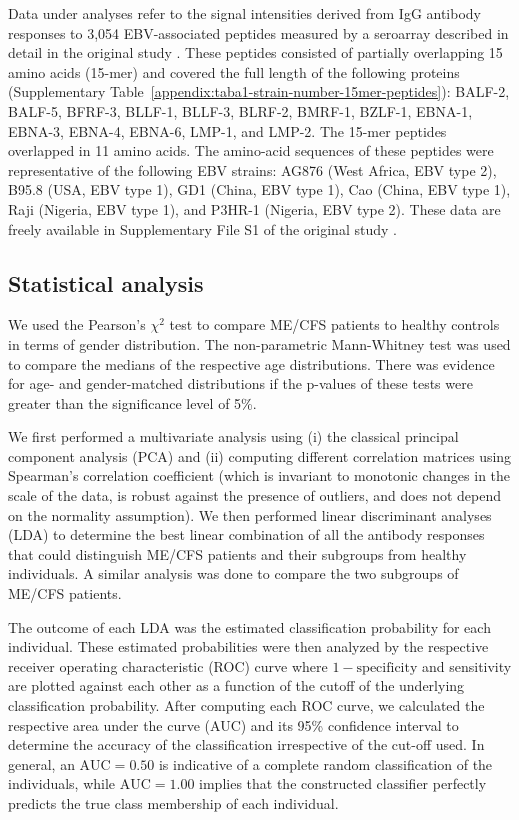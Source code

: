Data under analyses refer to the signal intensities derived from IgG antibody responses to 3,054 EBV-associated peptides measured by a seroarray described in detail in the original study \citep{loebel2017SerologicalProfiling}. These peptides consisted of partially overlapping 15 amino acids (15-mer) and covered the full length of the following proteins (Supplementary Table~\ref{appendix:taba1-strain-number-15mer-peptides}): BALF-2, BALF-5, BFRF-3, BLLF-1, BLLF-3, BLRF-2, BMRF-1, BZLF-1, EBNA-1, EBNA-3, EBNA-4, EBNA-6, LMP-1, and LMP-2. The 15-mer peptides overlapped in 11 amino acids. The amino-acid sequences of these peptides were representative of the following EBV strains: AG876 (West Africa, EBV type 2), B95.8 (USA, EBV type 1), GD1 (China, EBV type 1), Cao (China, EBV type 1), Raji (Nigeria, EBV type 1), and P3HR-1 (Nigeria, EBV type 2). These data are freely available in Supplementary File S1 of the original study \citep{loebel2017SerologicalProfiling}.


\subsection{Statistical analysis}

We used the Pearson's $\chi^2$ test to compare ME/CFS patients to healthy controls in terms of gender distribution. The non-parametric Mann-Whitney test was used to compare the medians of the respective age distributions. There was evidence for age- and gender-matched distributions if the p-values of these tests were greater than the significance level of 5\%.

We first performed a multivariate analysis using (i) the classical principal component analysis (PCA) and (ii) computing different correlation matrices using Spearman's correlation coefficient (which is invariant to monotonic changes in the scale of the data, is robust against the presence of outliers, and does not depend on the normality assumption). We then performed linear discriminant analyses (LDA) to determine the best linear combination of all the antibody responses that could distinguish ME/CFS patients and their subgroups from healthy individuals. A similar analysis was done to compare the two subgroups of ME/CFS patients.

The outcome of each LDA was the estimated classification probability for each individual. These estimated probabilities were then analyzed by the respective receiver operating characteristic (ROC) curve where $1 - \text{specificity}$ and sensitivity are plotted against each other as a function of the cutoff of the underlying classification probability. After computing each ROC curve, we calculated the respective area under the curve (AUC) and its 95\% confidence interval to determine the accuracy of the classification irrespective of the cut-off used. In general, an $\text{AUC} = 0.50$ is indicative of a complete random classification of the individuals, while $\text{AUC} = 1.00$ implies that the constructed classifier perfectly predicts the true class membership of each individual.


